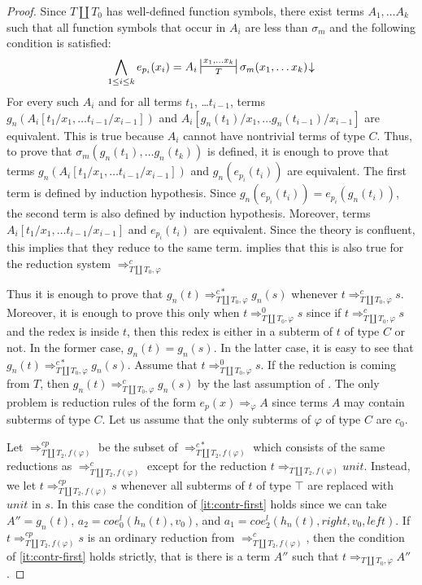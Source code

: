 \documentclass[reqno]{amsart}
\theoremstyle{definition}
\theoremstyle{remark}
\newcommand{\unit}{\mathit{unit}}
\newcommand{\leftI}{\mathit{left}}
\newcommand{\rightI}{\mathit{right}}
\newcommand{\coe}{\mathit{coe}}
\numberwithin{figure}{section}
\begin{document}
\begin{proof}
Since $T \amalg T_0$ has well-defined function symbols, there exist terms $A_1, \ldots A_k$ such that all function symbols that occur in $A_i$ are less than $\sigma_m$ and the following condition is satisfied:
\[ \bigwedge_{1 \leq i \leq k} e_{p_i}(x_i) = A_i \ssststile{T}{x_1, \ldots x_k} \sigma_m(x_1, \ldots x_k)\!\downarrow \]
For every such $A_i$ and for all terms $t_1$, \ldots $t_{i-1}$, terms $g_n(A_i[t_1/x_1, \ldots t_{i-1}/x_{i-1}])$ and $A_i[g_n(t_1)/x_1, \ldots g_n(t_{i-1})/x_{i-1}]$ are equivalent.
This is true because $A_i$ cannot have nontrivial terms of type $C$.
Thus, to prove that $\sigma_m(g_n(t_1), \ldots g_n(t_k))$ is defined, it is enough to prove that terms $g_n(A_i[t_1/x_1, \ldots t_{i-1}/x_{i-1}])$ and $g_n(e_{p_i}(t_i))$ are equivalent.
The first term is defined by induction hypothesis.
Since $g_n(e_{p_i}(t_i)) = e_{p_i}(g_n(t_i))$, the second term is also defined by induction hypothesis.
Moreover, terms $A_i[t_1/x_1, \ldots t_{i-1}/x_{i-1}]$ and $e_{p_i}(t_i)$ are equivalent.
Since the theory is confluent, this implies that they reduce to the same term.
 implies that this is also true for the reduction system $\Rightarrow_{T \amalg T_0, \varphi}^c$

Thus it is enough to prove that $g_n(t) \Rightarrow_{T \amalg T_0, \varphi}^{c*} g_n(s)$ whenever $t \Rightarrow_{T \amalg T_0, \varphi}^c s$.
Moreover, it is enough to prove this only when $t \Rightarrow_{T \amalg T_0, \varphi}^0 s$ since if $t \Rightarrow_{T \amalg T_0, \varphi}^c s$ and the redex is inside $t$,
then this redex is either in a subterm of $t$ of type $C$ or not.
In the former case, $g_n(t) = g_n(s)$.
In the latter case, it is easy to see that $g_n(t) \Rightarrow_{T \amalg T_0, \varphi}^{c*} g_n(s)$.
Assume that $t \Rightarrow_{T \amalg T_0, \varphi}^0 s$.
If the reduction is coming from $T$, then $g_n(t) \Rightarrow_{T \amalg T_0, \varphi}^c g_n(s)$ by the last assumption of .
The only problem is reduction rules of the form $e_p(x) \Rightarrow_\varphi A$ since terms $A$ may contain subterms of type $C$.
Let us assume that the only subterms of $\varphi$ of type $C$ are $c_0$.

Let $\Rightarrow_{T \amalg T_2, f(\varphi)}^{cp}$ be the subset of $\Rightarrow_{T \amalg T_2, f(\varphi)}^{c*}$ which consists of the same reductions as $\Rightarrow_{T \amalg T_2, f(\varphi)}^c$
except for the reduction $t \Rightarrow_{T \amalg T_2, f(\varphi)} \unit$.
Instead, we let $t \Rightarrow_{T \amalg T_2, f(\varphi)}^{cp} s$ whenever all subterms of $t$ of type $\top$ are replaced with $\unit$ in $s$.
In this case the condition of \eqref{it:contr-first} holds since we can take $A'' = g_n(t)$, $a_2 = \coe^l_0(h_n(t), v_0)$, and $a_1 = \coe^l_2(h_n(t), \rightI, v_0, \leftI)$.
If $t \Rightarrow_{T \amalg T_2, f(\varphi)}^{cp} s$ is an ordinary reduction from $\Rightarrow_{T \amalg T_2, f(\varphi)}^c$, then the condition of \eqref{it:contr-first} holds strictly,
that is there is a term $A''$ such that $t \Rightarrow_{T \amalg T_0, \varphi} A''$.


\end{proof}
\end{document}
